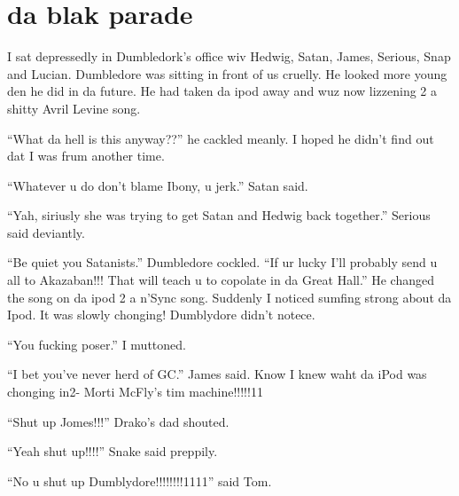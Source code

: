 \section{da blak parade}

\begin{sloppypar}
\end{sloppypar}


I sat depressedly in Dumbledork's office wiv Hedwig, Satan, James, Serious, Snap and Lucian. Dumbledore was sitting in front of us cruelly. He looked more young den he did in da future. He had taken da ipod away and wuz now lizzening 2 a shitty Avril Levine song.

\enquote{What da hell is this anyway??} he cackled meanly. I hoped he didn't find out dat I was frum another time.

\enquote{Whatever u do don't blame Ibony, u jerk.} Satan said.

\enquote{Yah, siriusly she was trying to get Satan and Hedwig back together.} Serious said deviantly.

\enquote{Be quiet you Satanists.} Dumbledore cockled. \enquote{If ur lucky I'll probably send u all to Akazaban!!! That will teach u to copolate in da Great Hall.} He changed the song on da ipod 2 a n'Sync song. Suddenly I noticed sumfing strong about da Ipod. It was slowly chonging! Dumblydore didn't notece.

\enquote{You fucking poser.} I muttoned.

\enquote{I bet you've never herd of GC.} James said. Know I knew waht da iPod was chonging in2- Morti McFly's tim machine!!!!!11

\enquote{Shut up Jomes!!!} Drako's dad shouted.

\enquote{Yeah shut up!!!!} Snake said preppily.

\enquote{No u shut up Dumblydore!!!!!!!!1111} said Tom.

